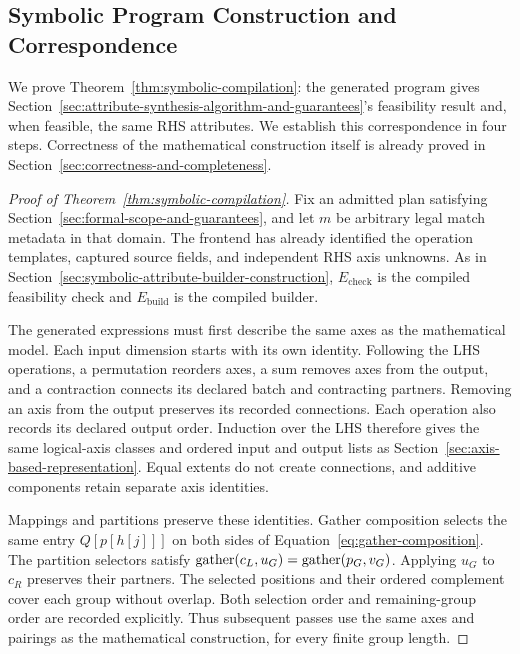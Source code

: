 \subsection{Symbolic Program Construction and Correspondence}
\label{app:symbolic-program-construction-and-correspondence}
We prove Theorem~\ref{thm:symbolic-compilation}: the generated program gives
Section~\ref{sec:attribute-synthesis-algorithm-and-guarantees}'s feasibility result and, when
feasible, the same RHS attributes. We establish this correspondence in
four steps. Correctness of the mathematical construction itself is already
proved in Section~\ref{sec:correctness-and-completeness}.

\begin{proof}[Proof of Theorem~\ref{thm:symbolic-compilation}]
Fix an admitted plan satisfying Section~\ref{sec:formal-scope-and-guarantees}, and let $m$
be arbitrary legal match metadata in that domain. The frontend has already
identified the operation templates, captured source fields, and independent
RHS axis unknowns. As in Section~\ref{sec:symbolic-attribute-builder-construction},
$E_{\mathrm{check}}$ is the compiled feasibility check and $E_{\mathrm{build}}$ is the compiled builder.

The generated expressions must first describe the same axes as the
mathematical model. Each input dimension starts with its own identity.
Following the LHS operations, a permutation reorders axes, a sum removes
axes from the output, and a contraction connects its declared batch and
contracting partners. Removing an axis from the output preserves its
recorded connections. Each operation also records its declared output
order. Induction over the LHS therefore gives the same logical-axis
classes and ordered input and output lists as Section~\ref{sec:axis-based-representation}.
Equal extents do not create connections, and additive components retain
separate axis identities.

Mappings and partitions preserve these identities. Gather composition
selects the same entry $Q[p[h[j]]]$ on both sides of
Equation~\eqref{eq:gather-composition}. The partition selectors satisfy
$\operatorname{gather}(c_L,u_G)=\operatorname{gather}(p_G,v_G)$. Applying $u_G$ to $c_R$ preserves
their partners. The selected positions and their ordered complement cover
each group without overlap. Both selection order and remaining-group order
are recorded explicitly. Thus subsequent passes use the same axes and
pairings as the mathematical construction, for every finite group length.


\end{proof}
